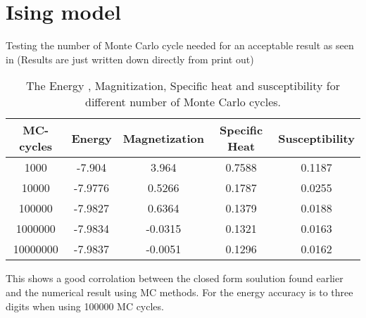 \section{Ising model}
Testing the number of Monte Carlo cycle needed for an acceptable result as seen in  (Results are just written down directly from print out)

\begin{table}[H] 
\centering
\caption{The Energy , Magnitization, Specific heat and susceptibility for different number of Monte Carlo cycles.}
\begin{center}
\begin{tabular}{|c|c|c|c|c|}
\hline
MC-cycles & Energy & Magnetization & Specific Heat & Susceptibility \\
\hline
1000 & -7.904 & 3.964 & 0.7588 & 0.1187 \\
10000 & -7.9776 & 0.5266 & 0.1787 & 0.0255 \\
100000 & -7.9827 & 0.6364 & 0.1379 & 0.0188\\
1000000 & -7.9834 & -0.0315 & 0.1321 & 0.0163 \\
10000000 & -7.9837 & -0.0051 & 0.1296 & 0.0162 \\
\hline 

\end{tabular}
\end{center}
\label{tab:MCising}
\end{table}

This shows a good corrolation between the closed form soulution found earlier and the numerical result using MC methods. For the energy accuracy is to three digits when using 100000 MC cycles.
 